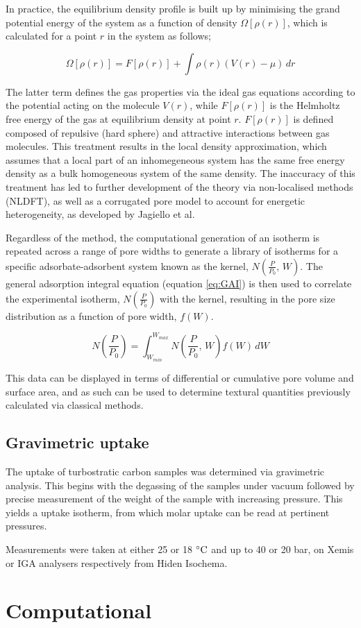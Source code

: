 In practice, the equilibrium density profile is built up by minimising the grand potential energy of the system as a function of density $\Omega[\rho(r)]$, which is calculated for a point $r$ in the system as follows;

\begin{equation}
\Omega[\rho(r)] = F[\rho(r)] + \int \rho(r)\left(V(r) - \mu\right) \,dr
\end{equation}

The latter term defines the gas properties via the ideal gas equations according to the potential acting on the molecule $V(r)$, while $F[\rho(r)]$ is the Helmholtz free energy of the gas at equilibrium density at point $r$. $F[\rho(r)]$ is defined composed of repulsive (hard sphere) and attractive interactions between gas molecules. This treatment results in the local density approximation, which assumes that a local part of an inhomegeneous system has the same free energy density as a bulk homogeneous system of the same density. The inaccuracy of this treatment has led to further development of the theory via non-localised methods (NLDFT),  \citep{tarazona1987phase, lastoskie1993pore, landers2013density} 
as well as a corrugated pore model to account for energetic heterogeneity, as developed by Jagiello et al.\citep{Jagiello20132D}

Regardless of the method, the computational generation of an isotherm is repeated across a range of pore widths to generate a library of isotherms for a specific adsorbate-adsorbent system known as the kernel, $N\left(\frac{P}{P_0}, \, W\right)$. The general adsorption integral equation (equation \ref{eq:GAI}) is then used to correlate the experimental isotherm, $N\left(\frac{P}{P_0}\right)$  with the kernel, resulting in the pore size distribution as a function of pore width, $f(W)$.\citep{Thommes2015Physisorption}

\begin{equation} \label{eq:GAI}
    N\left(\frac{P}{P_0}\right) = \int_{W_{min}}^{W_{max}} N\left(\frac{P}{P_0}, \, W \right) f(W) \, dW
\end{equation}

This data can be displayed in terms of differential or cumulative pore volume and surface area, and as such can be used to determine textural quantities previously calculated via classical methods.

\subsection{\texorpdfstring{Gravimetric  uptake}{Gravimetric CO2 uptake}}
The  uptake of turbostratic carbon samples was determined via gravimetric analysis. This begins with the degassing of the samples under vacuum followed by precise measurement of the weight of the sample with increasing  pressure. This yields a  uptake isotherm, from which molar uptake can be read at pertinent pressures.

Measurements were taken at either 25 or 18 $\rm ^{\circ}C$ and up to 40 or 20 bar, on Xemis or IGA analysers respectively from Hiden Isochema. 

\section{Computational}



